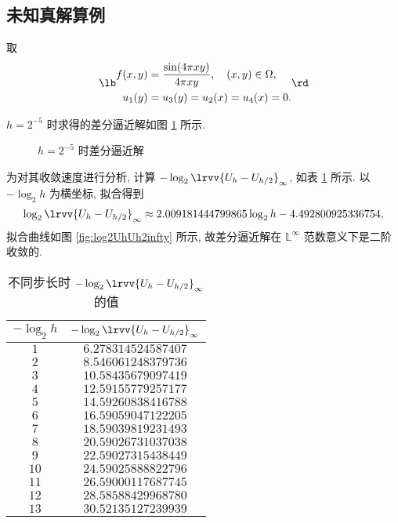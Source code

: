\documentclass[UTF8, a4paper, 12pt, oneside, onecolumn]{article}
\begin{document}

\subsection{未知真解算例}

取
\begin{equation*}
	\lb\begin{aligned}
		f(x, y) &= \dfrac{\sin(4\pi xy)}{4\pi xy},\quad (x, y) 
		\in \Omega,\\
		u_1(y) &= u_3(y) = u_2(x) = u_4(x) = 0.
	\end{aligned}\rd
\end{equation*}

$h = 2^{-5}$ 时求得的差分逼近解如图 \ref{fig:unknown1} 所示.

\begin{figure}[H]\centering
	\resizebox{0.9\linewidth}{!}{}
	\caption{$h = 2^{-5}$ 时差分逼近解}\label{fig:unknown1}
\end{figure}

为对其收敛速度进行分析, 计算 $-\log_2\lrvv{U_h - U_{h / 2}}_\infty$, 如表 \ref{tab:errorNorm2} 所示. 以 $-\log_2 h$ 为横坐标, 拟合得到
$$\log_2\lrvv{U_h - U_{h / 2}}_\infty \approx 2.009181444799865\log_2 h - 4.492800925336754,$$
拟合曲线如图 \ref{fig:log2UhUh2infty} 所示, 故差分逼近解在 $\mathbb{L}^\infty$ 范数意义下是二阶收敛的.

\begin{table}[H]\centering\heiti{}
	\caption{不同步长时 $-\log_2\lrvv{U_h - U_{h / 2}}_\infty$ 的值}\label{tab:errorNorm2}
	\begin{tabular}{|c|c|}\hline
		$-\log_2 h$	&	$-\log_2\lrvv{U_h - U_{h / 2}}_\infty$\\\hline
		$1$		&	$6.278314524587407$\\\hline
		$2$		&	$8.546061248379736$\\\hline
		$3$		&	$10.58435679097419$\\\hline
		$4$		&	$12.59155779257177$\\\hline
		$5$		&	$14.59260838416788$\\\hline
		$6$		&	$16.59059047122205$\\\hline
		$7$		&	$18.59039819231493$\\\hline
		$8$		&	$20.59026731037038$\\\hline
		$9$		&	$22.59027315438449$\\\hline
		$10$	&	$24.59025888822796$\\\hline
		$11$	&	$26.59000117687745$\\\hline
		$12$	&	$28.58588429968780$\\\hline
		$13$	&	$30.52135127239939$\\\hline
	\end{tabular}
\end{table}
\end{document}
